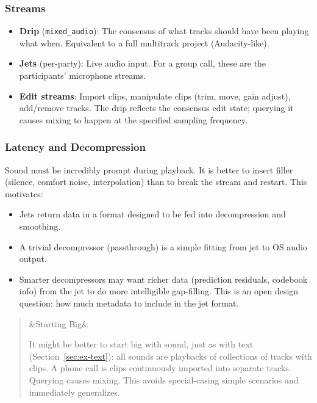 \documentclass[11pt, letterpaper]{article}
\newenvironment{designnote}[1][]
  {\par\medskip\begin{quote}\small
   \ifx&#1&\else\noindent{\bfseries\color{jetcolor} #1}\par\smallskip\fi}
  {\end{quote}\medskip}
\begin{document}
\subsubsection{Streams}
\begin{itemize}[leftmargin=2em]
  \item \textbf{Drip} (\texttt{mixed\_audio}): The consensus of what tracks should have
    been playing what when. Equivalent to a full multitrack project (Audacity-like).
  \item \textbf{Jets} (per-party): Live audio input. For a group call, these are the
    participants' microphone streams.
  \item \textbf{Edit streams}: Import clips, manipulate clips (trim, move, gain adjust),
    add/remove tracks. The drip reflects the consensus edit state; querying it causes
    mixing to happen at the specified sampling frequency.
\end{itemize}

\subsubsection{Latency and Decompression}

Sound must be incredibly prompt during playback. It is better to insert filler
(silence, comfort noise, interpolation) than to break the stream and restart. This
motivates:

\begin{itemize}[leftmargin=2em]
  \item Jets return data in a format designed to be fed into decompression and
    smoothing.
  \item A trivial decompressor (passthrough) is a simple fitting from jet to OS audio
    output.
  \item Smarter decompressors may want richer data (prediction residuals, codebook
    info) from the jet to do more intelligible gap-filling. This is an open design
    question: how much metadata to include in the jet format.
\end{itemize}

\begin{designnote}[Starting Big]
It might be better to start big with sound, just as with text (Section~\ref{sec:ex-text}):
all sounds are playbacks of collections of tracks with clips. A phone call is clips
continuously imported into separate tracks. Querying causes mixing. This avoids
special-casing simple scenarios and immediately generalizes.
\end{designnote}
\end{document}
